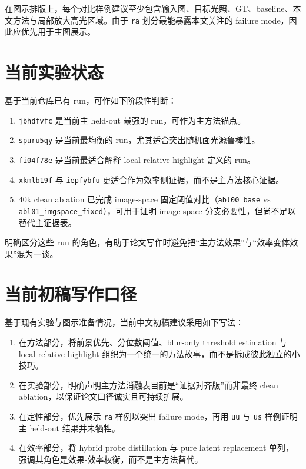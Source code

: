 \documentclass[UTF8,a4paper]{ctexart}
\begin{document}
在图示排版上，每个对比样例建议至少包含输入图、目标光照、GT、baseline、本文方法与局部放大高光区域。由于 \texttt{ra} 划分最能暴露本文关注的 failure mode，因此应优先用于主图展示。

\section{当前实验状态}

基于当前仓库已有 run，可作如下阶段性判断：

\begin{enumerate}
\item \texttt{jbhdfvfc} 是当前主 held-out 最强的 run，可作为主方法锚点。
\item \texttt{spuru5qy} 是当前最均衡的 run，尤其适合突出随机面光源鲁棒性。
\item \texttt{fi04f78e} 是当前最适合解释 local-relative highlight 定义的 run。
\item \texttt{xkmlb19f} 与 \texttt{iepfybfu} 更适合作为效率侧证据，而不是主方法核心证据。
\item 40k clean ablation 已完成 image-space 固定阈值对比（\texttt{abl00\_base} vs \texttt{abl01\_imgspace\_fixed}），可用于证明 image-space 分支必要性，但尚不足以替代主证据表。
\end{enumerate}

明确区分这些 run 的角色，有助于论文写作时避免把“主方法效果”与“效率变体效果”混为一谈。

\section{当前初稿写作口径}

基于现有实验与图示准备情况，当前中文初稿建议采用如下写法：

\begin{enumerate}
\item 在方法部分，将前景优先、分位数阈值、blur-only threshold estimation 与 local-relative highlight 组织为一个统一的方法故事，而不是拆成彼此独立的小技巧。
\item 在实验部分，明确声明主方法消融表目前是“证据对齐版”而非最终 clean ablation，以保证论文口径诚实且可持续扩展。
\item 在定性部分，优先展示 \texttt{ra} 样例以突出 failure mode，再用 \texttt{uu} 与 \texttt{us} 样例证明主 held-out 结果并未牺牲。
\item 在效率部分，将 hybrid probe distillation 与 pure latent replacement 单列，强调其角色是效果-效率权衡，而不是主方法替代。
\end{enumerate}
\end{document}
